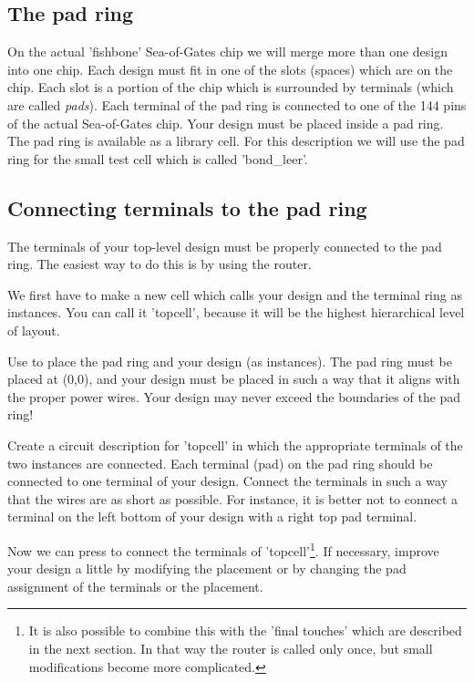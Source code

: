 \subsection{The pad ring}
On the actual 'fishbone' Sea-of-Gates chip we will merge more than one design
into one chip.  Each design must fit in one of the slots (spaces) which are on
the chip. Each slot is a portion of the chip which is surrounded by terminals
(which are called {\sl pads}).  Each
terminal of the pad ring is connected to one of the 144 pins of the actual
Sea-of-Gates chip.  Your design must be placed inside a pad ring.  The pad ring
is available as a library cell. For this description we will use the pad ring for
the small test cell which is called 'bond\_leer'.

\subsection{Connecting terminals to the pad ring}
The terminals of your top-level design must be properly connected to the pad
ring. The easiest way to do this is by using the router.

We first have to make a new cell which calls your design and the terminal ring
as instances. You can call it 'topcell', because it will be the highest
hierarchical level of layout.

Use  to place the pad ring and your design (as instances). The
pad ring must be placed at (0,0), and your design must be placed in such a way
that it aligns with the proper power wires. Your design may never exceed the
boundaries of the pad ring!

Create a circuit description for 'topcell' in which the appropriate terminals
of the two instances are connected.  Each terminal (pad) on the pad ring
should be connected to one terminal of your design. Connect the terminals in
such a way that the wires are as short as possible. For instance, it is better
not to connect a terminal on the left bottom of your design with a right top
pad terminal.

Now we can press  to connect the terminals of
'topcell'\footnote{It is also possible to combine this with the 'final
touches' which are described in the next section.  In that way the router is
called only once, but small modifications become more complicated.}.  If
necessary, improve your design a little by modifying the placement or by
changing the pad assignment of the terminals or the placement.

